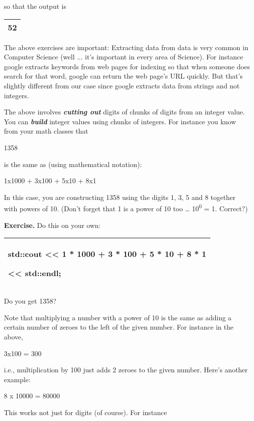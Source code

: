\documentclass[
]{article}
\begin{document}
so that the output is

\begin{longtable}[]{@{}l@{}}
\toprule
\endhead
52\tabularnewline
\bottomrule
\end{longtable}

The above exercises are important: Extracting data from data is very
common in Computer Science (well ... it's important in every area of
Science). For instance google extracts keywords from web pages for
indexing so that when someone does search for that word, google can
return the web page's URL quickly. But that's slightly different from
our case since google extracts data from strings and not integers.

The above involves \emph{\textbf{cutting out}} digits of chunks of
digits from an integer value. You can \emph{\textbf{build}} integer
values using chunks of integers. For instance you know from your math
classes that

1358

is the same as (using mathematical notation):

1x1000 + 3x100 + 5x10 + 8x1

In this case, you are constructing 1358 using the digits 1, 3, 5 and 8
together with powers of 10. (Don't forget that 1 is a power of 10 too
\ldots{} 10\textsuperscript{0} = 1. Correct?)

\textbf{Exercise.} Do this on your own:

\begin{longtable}[]{@{}l@{}}
\toprule
\endhead
\begin{minipage}[t]{0.97\columnwidth}\raggedright
std::cout \textless\textless{} 1 * 1000 + 3 * 100 + 5 * 10 + 8 * 1

\textless\textless{} std::endl;\strut
\end{minipage}\tabularnewline
\bottomrule
\end{longtable}

Do you get 1358?

Note that multiplying a number with a power of 10 is the same as adding
a certain number of zeroes to the left of the given number. For instance
in the above,

3x100 = 300

i.e., multiplication by 100 just adds 2 zeroes to the given number.
Here's another example:

8 x 10000 = 80000

This works not just for digits (of course). For instance
\end{document}
